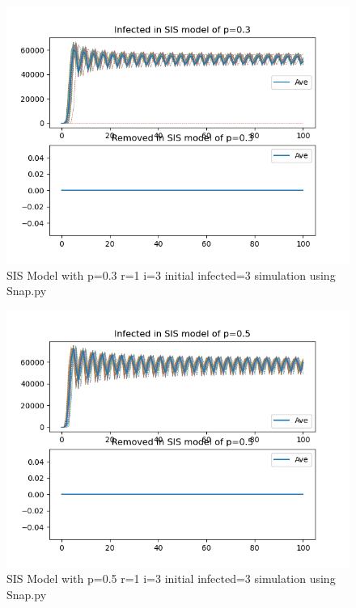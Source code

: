 \documentclass{subfile}
\begin{document}
  \begin{figure}
  \includegraphics[scale=0.8]{sisp03r1i3s3}
  \caption[SIS p=0.3,r=1,i=3,init infected=3]{SIS Model with p=0.3 r=1 i=3 initial infected=3 simulation using Snap.py}
  \end{figure}
  \begin{figure}
  \includegraphics[scale=0.8]{sisp05r1i3s3}
  \caption[SIS p=0.5,r=1,i=3,init infected=3]{SIS Model with p=0.5 r=1 i=3 initial infected=3 simulation using Snap.py}
  \end{figure}
\end{document}
